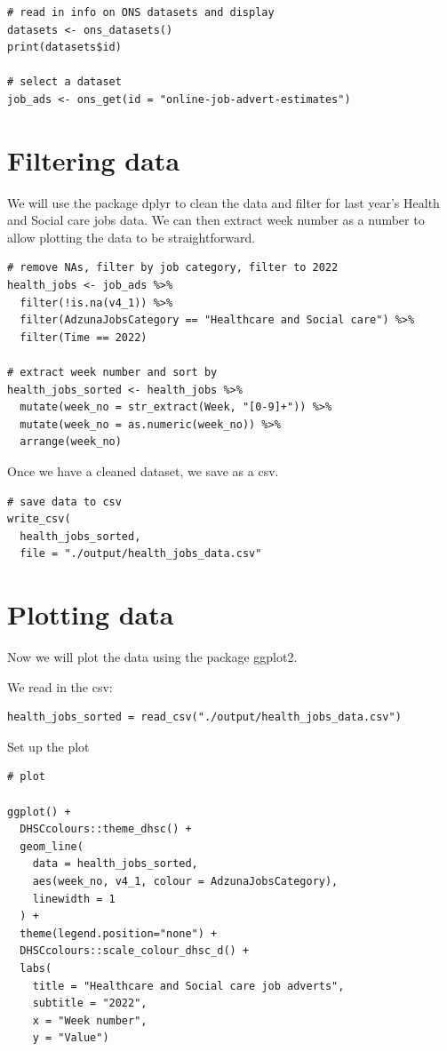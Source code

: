 \documentclass[
]{book}
\begin{document}
\begin{verbatim}
# read in info on ONS datasets and display
datasets <- ons_datasets()
print(datasets$id)

# select a dataset
job_ads <- ons_get(id = "online-job-advert-estimates")
\end{verbatim}

\hypertarget{filtering-data}{%
\section{Filtering data}\label{filtering-data}}

We will use the package dplyr to clean the data and filter for last year's Health and Social care jobs data. We can then extract week number as a number to allow plotting the data to be straightforward.

\begin{verbatim}
# remove NAs, filter by job category, filter to 2022
health_jobs <- job_ads %>%
  filter(!is.na(v4_1)) %>%
  filter(AdzunaJobsCategory == "Healthcare and Social care") %>%
  filter(Time == 2022)

# extract week number and sort by
health_jobs_sorted <- health_jobs %>%
  mutate(week_no = str_extract(Week, "[0-9]+")) %>%
  mutate(week_no = as.numeric(week_no)) %>%
  arrange(week_no)
\end{verbatim}

Once we have a cleaned dataset, we save as a csv.

\begin{verbatim}
# save data to csv
write_csv(
  health_jobs_sorted,
  file = "./output/health_jobs_data.csv"
\end{verbatim}

\hypertarget{plotting-data}{%
\section{Plotting data}\label{plotting-data}}

Now we will plot the data using the package ggplot2.

We read in the csv:

\begin{verbatim}
health_jobs_sorted = read_csv("./output/health_jobs_data.csv")
\end{verbatim}

Set up the plot

\begin{verbatim}
# plot

ggplot() +
  DHSCcolours::theme_dhsc() +
  geom_line(
    data = health_jobs_sorted,
    aes(week_no, v4_1, colour = AdzunaJobsCategory),
    linewidth = 1
  ) +
  theme(legend.position="none") +
  DHSCcolours::scale_colour_dhsc_d() +
  labs(
    title = "Healthcare and Social care job adverts",
    subtitle = "2022",
    x = "Week number",
    y = "Value")
\end{verbatim}
\end{document}
